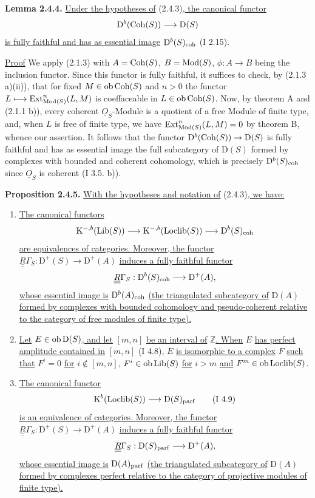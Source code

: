 \textbf{Lemma 2.4.4.} \uline{Under the hypotheses of} (2.4.3)\uline{, the canonical functor}
\[
\mathrm D^b(\operatorname{Coh}(S))\longrightarrow\mathrm D(S)
\]
\uline{is fully faithful and has as essential image} $\mathrm D^b(S)_{\mathrm{coh}}$ (I 2.15).

\uline{Proof} We apply (2.1.3) with $A=\operatorname{Coh}(S)$, $B=\operatorname{Mod}(S)$, $\phi:A\to B$ being the inclusion functor. Since this functor is fully faithful, it suffices to check, by (2.1.3 a)(ii)), that for fixed $M\in\operatorname{ob}\operatorname{Coh}(S)$ and $n>0$ the functor $L\longmapsto \operatorname{Ext}^n_{\operatorname{Mod}(S)}(L,M)$ is coeffaceable in $L\in\operatorname{ob}\operatorname{Coh}(S)$. Now, by theorem A and (2.1.1 b)), every coherent $\underline{O}_S$-Module is a quotient of a free Module of finite type, and, when $L$ is free of finite type, we have $\operatorname{Ext}^n_{\operatorname{Mod}(S)}(L,M)=0$ by theorem B, whence our assertion. It follows that the functor $\mathrm D^b(\operatorname{Coh}(S))\to\mathrm D(S)$ is fully faithful and has as essential image the full subcategory of $\mathrm D(S)$ formed by complexes with bounded and coherent cohomology, which is precisely $\mathrm D^b(S)_{\mathrm{coh}}$ since $\underline{O}_S$ is coherent (I 3.5. b)).

\textbf{Proposition 2.4.5.} \uline{With the hypotheses and notation of} (2.4.3)\uline{, we have:}
\begin{enumerate}[label=\alph*)]
\item \uline{The canonical functors}
\[
\mathrm K^{-,b}(\operatorname{Lib}(S))\longrightarrow\mathrm K^{-,b}(\operatorname{Loclib}(S))\longrightarrow\mathrm D^b(S)_{\mathrm{coh}}
\]
\uline{are equivalences of categories. Moreover, the functor} $\underline{\underline{R}}\Gamma_S:\mathrm D^+(S)\to\mathrm D^+(A)$ \uline{induces a fully faithful functor}
\[
\underline{\underline{R}}\Gamma_S:\mathrm D^b(S)_{\mathrm{coh}}\longrightarrow\mathrm D^+(A),
\]
%
\uline{whose essential image is} $\mathrm D^b(A)_{\mathrm{coh}}$ \uline{(the triangulated subcategory of} $\mathrm D(A)$ \uline{formed by complexes with bounded cohomology and pseudo-coherent relative to the category of free modules of finite type).}
\item \uline{Let} $E\in\operatorname{ob}\mathrm D(S)$\uline{, and let} $[m,n]$ \uline{be an interval of} $\mathbb Z$\uline{. When} $E$ \uline{has perfect amplitude contained in} $[m,n]$ (I 4.8), $E$ \uline{is isomorphic to a complex} $F$ \uline{such that} $F^i=0$ \uline{for} $i\notin[m,n]$, $F^i\in\operatorname{ob}\operatorname{Lib}(S)$ \uline{for} $i>m$ \uline{and} $F^m\in\operatorname{ob}\operatorname{Loclib}(S)$.
\item \uline{The canonical functor}
\[
\mathrm K^b(\operatorname{Loclib}(S))\longrightarrow\mathrm D(S)_{\mathrm{parf}}\qquad(\text{I }4.9)
\]
\uline{is an equivalence of categories. Moreover, the functor} $\underline{\underline{R}}\Gamma_S:\mathrm D^+(S)\to\mathrm D^+(A)$ \uline{induces a fully faithful functor}
\[
\underline{\underline{R}}\Gamma_S:\mathrm D(S)_{\mathrm{parf}}\longrightarrow\mathrm D^+(A),
\]
\uline{whose essential image is} $\mathrm D(A)_{\mathrm{parf}}$ \uline{(the triangulated subcategory of} $\mathrm D(A)$ \uline{formed by complexes perfect relative to the category of projective modules of finite type).}
\end{enumerate}

